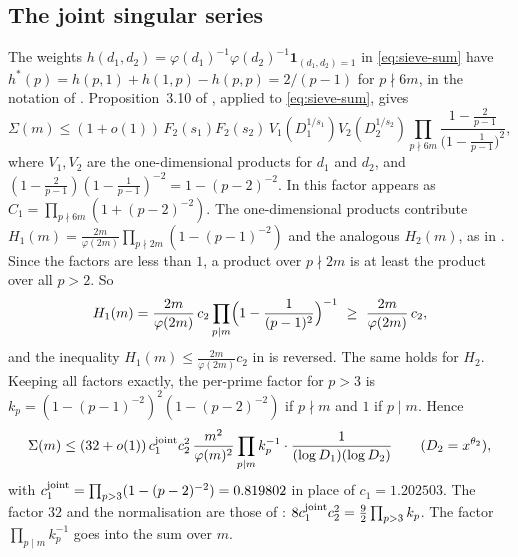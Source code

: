 \documentclass[11pt,a4paper]{amsart}
\theoremstyle{remark}
\numberwithin{equation}{section}
\begin{document}
\subsection{The joint singular series}
The weights $h(d_1,d_2)=\varphi(d_1)^{-1}\varphi(d_2)^{-1}\mathbf 1_{(d_1,d_2)=1}$ in \eqref{eq:sieve-sum} have
$h^*(p)=h(p,1)+h(1,p)-h(p,p)=2/(p-1)$ for $p\nmid6m$, in the notation of \cite[(3.10)]{NX}. Proposition~3.10 of
\cite{NX}, applied to \eqref{eq:sieve-sum}, gives
\[
\Sigma(m)\le(1+o(1))\,F_2(s_1)F_2(s_2)\,V_1(D_1^{1/s_1})V_2(D_2^{1/s_2})\prod_{p\nmid6m}
\frac{1-\frac2{p-1}}{\bigl(1-\frac1{p-1}\bigr)^2},
\]
where $V_1,V_2$ are the one-dimensional products for $d_1$ and $d_2$, and
$(1-\frac2{p-1})(1-\frac1{p-1})^{-2}=1-(p-2)^{-2}$. In \cite{NX} this factor appears as
$C_1=\prod_{p\nmid6m}(1+(p-2)^{-2})$. The one-dimensional products contribute
$H_1(m)=\frac{2m}{\varphi(2m)}\prod_{p\nmid2m}(1-(p-1)^{-2})$ and the analogous $H_2(m)$, as in \cite{NX}. Since
the factors are less than $1$, a product over $p\nmid2m$ is at least the product over all $p>2$. So
\[
H_1(m)=\frac{2m}{\varphi(2m)}\,c_2\prod_{p\mid m}\Bigl(1-\frac1{(p-1)^2}\Bigr)^{-1}\ \ge\ \frac{2m}{\varphi(2m)}\,c_2,
\]
and the inequality $H_1(m)\le\frac{2m}{\varphi(2m)}c_2$ in \cite{NX} is reversed. The same holds for $H_2$. Keeping
all factors exactly, the per-prime factor for $p>3$ is $k_p=(1-(p-1)^{-2})^2(1-(p-2)^{-2})$ if $p\nmid m$ and $1$ if
$p\mid m$. Hence
\begin{equation}\label{eq:Sigma}
\Sigma(m)\le(32+o(1))\,c_1^{\rm joint}c_2^2\,\frac{m^2}{\varphi(m)^2}\prod_{p\mid m}k_p^{-1}\cdot
\frac{1}{(\log D_1)(\log D_2)}\qquad(D_2=x^{\theta_2}),
\end{equation}
with $c_1^{\rm joint}=\prod_{p>3}(1-(p-2)^{-2})=0.819802$ in place of $c_1=1.202503$. The factor $32$ and the
normalisation are those of \cite{NX}: $8c_1^{\rm joint}c_2^2=\frac92\prod_{p>3}k_p$. The factor
$\prod_{p\mid m}k_p^{-1}$ goes into the sum over $m$.
\end{document}
